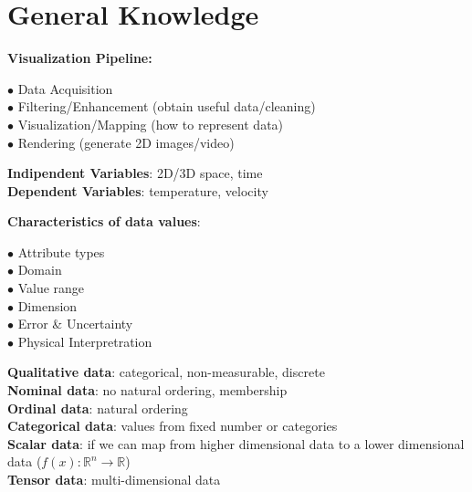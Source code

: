 \section{General Knowledge}
\textbf{Visualization Pipeline:}

$\bullet$ Data Acquisition \\
$\bullet$ Filtering/Enhancement (obtain useful data/cleaning) \\
$\bullet$ Visualization/Mapping (how to represent data) \\
$\bullet$ Rendering (generate 2D images/video)

\textbf{Indipendent Variables}: 2D/3D space, time \\
\textbf{Dependent Variables}: temperature, velocity

\textbf{Characteristics of data values}:

$\bullet$ Attribute types \\
$\bullet$ Domain \\
$\bullet$ Value range \\
$\bullet$ Dimension \\
$\bullet$ Error \& Uncertainty \\
$\bullet$ Physical Interpretration

\textbf{Qualitative data}: categorical, non-measurable, discrete \\
\textbf{Nominal data}: no natural ordering, membership \\
\textbf{Ordinal data}: natural ordering \\
\textbf{Categorical data}: values from fixed number or categories \\
\textbf{Scalar data}: if we can map from higher dimensional data to a lower dimensional data ($f(x): \mathbb{R}^n \rightarrow \mathbb{R}$) \\
\textbf{Tensor data}: multi-dimensional data \\
